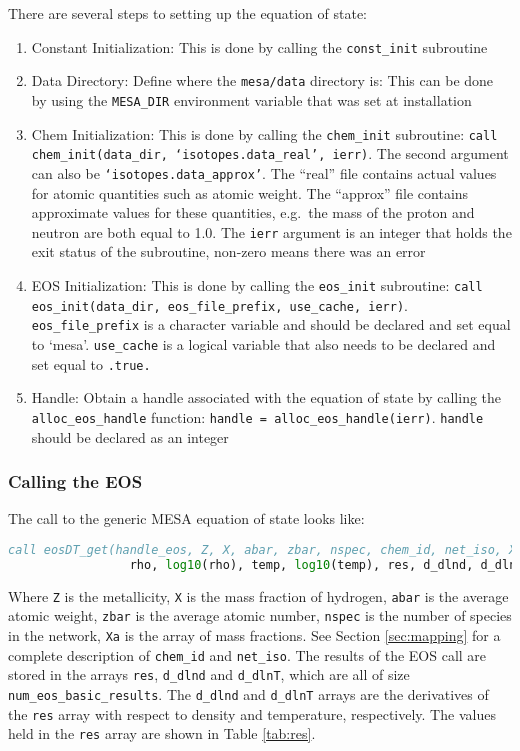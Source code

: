 There are several steps to setting up the equation of state:
\begin{enumerate}
\item Constant Initialization: This is done by calling the {\tt const\_init} 
subroutine

\item Data Directory: Define where the {\tt mesa/data} directory is: This can 
be done by using the {\tt MESA\_DIR} environment variable that was set 
at installation

\item Chem Initialization: This is done by calling the {\tt chem\_init} 
subroutine: {\tt call chem\_init(data\_dir, `isotopes.data\_real', ierr)}. 
The second argument can also be {\tt `isotopes.data\_approx'}. The ``real'' 
file contains actual values for 
atomic quantities such as atomic weight. The ``approx'' file contains 
approximate values for these quantities, e.g.\ the mass of the proton and 
neutron are both equal to 1.0. The {\tt ierr} argument is an integer that 
holds the exit status of the subroutine, non-zero means there was an error

\item EOS Initialization: This is done by calling the {\tt eos\_init} 
subroutine: {\tt call eos\_init(data\_dir, eos\_file\_prefix, use\_cache, 
ierr)}. {\tt eos\_file\_prefix} is a character variable and should be 
declared and set equal to `mesa'. {\tt use\_cache} is a logical variable that 
also needs to be declared and set equal to {\tt .true.}

\item Handle: Obtain a handle associated with the equation of state by 
calling the {\tt alloc\_eos\_handle} function: 
{\tt handle = alloc\_eos\_handle(ierr)}. {\tt handle} should be declared as an 
integer
\end{enumerate}

\subsubsection{Calling the EOS}

The call to the generic {\sf MESA} equation of state looks like:
\begin{lstlisting}[language=fortran,mathescape=false]
  call eosDT_get(handle_eos, Z, X, abar, zbar, nspec, chem_id, net_iso, Xa, &
                 rho, log10(rho), temp, log10(temp), res, d_dlnd, d_dlnT, ierr)
\end{lstlisting}
Where {\tt Z} is the metallicity, {\tt X} is the mass fraction of hydrogen, 
{\tt abar} is the average atomic weight, {\tt zbar} is the average atomic 
number, {\tt nspec} is the number of species in the network, {\tt Xa} is 
the array of mass fractions. See Section \ref{sec:mapping} for a complete 
description of {\tt chem\_id} and {\tt net\_iso}. The results of the EOS call 
are stored in the arrays {\tt res}, {\tt d\_dlnd} and {\tt d\_dlnT}, which 
are all of size {\tt num\_eos\_basic\_results}. The {\tt d\_dlnd} and 
{\tt d\_dlnT} arrays are the derivatives of the {\tt res} array with respect 
to density and temperature, respectively. The values held in the {\tt res} 
array are shown in Table \ref{tab:res}.

